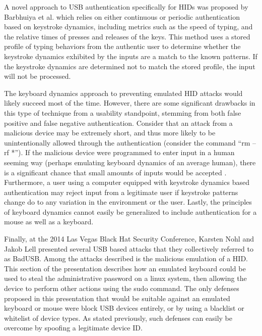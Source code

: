 \documentclass{ieee}
\begin{document}
A novel approach to USB authentication specifically for HIDs was proposed by Barbhuiya et al. \cite{barbhuiya} which relies on either continuous or periodic authentication based on keystroke dynamics, including metrics such as the speed of typing, and the relative times of presses and releases of the keys. This method uses a stored profile of typing behaviors from the authentic user to determine whether the keystroke dynamics exhibited by the inputs are a match to the known patterns. If the keystroke dynamics are determined not to match the stored profile, the input will not be processed.

The keyboard dynamics approach to preventing emulated HID attacks would likely succeed most of the time. However, there are some significant drawbacks in this type of technique from a usability standpoint, stemming from both false positive and false negative authentication. Consider that an attack from a malicious device may be extremely short, and thus more likely to be unintentionally allowed through the authentication (consider the command ``rm –rf *''). If the malicious device were programmed to enter input in a human seeming way (perhaps emulating keyboard dynamics of an average human), there is a significant chance that small amounts of inputs would be accepted \cite{shahzad}. Furthermore, a user using a computer equipped with keystroke dynamics based authentication may reject input from a legitimate user if keystroke patterns change do to any variation in the environment or the user. Lastly, the principles of keyboard dynamics cannot easily be generalized to include authentication for a mouse as well as a keyboard.

Finally, at the 2014 Las Vegas Black Hat Security Conference, Karsten Nohl and Jakob Lell presented several USB based attacks that they collectively referred to as BadUSB. Among the attacks described is the malicious emulation of a HID. This section of the presentation describes how an emulated keyboard could be used to steal the administrative password on a linux system, then allowing the device to perform other actions using the sudo command. The only defenses proposed in this presentation that would be suitable against an emulated keyboard or mouse were block USB devices entirely, or by using a blacklist or whitelist of device types. As stated previously, such defenses can easily be overcome by spoofing a legitimate device ID.


\nocite{nohl}


\end{document}
